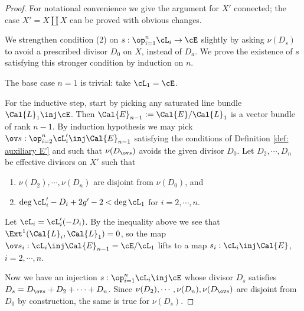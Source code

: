 \begin{proof} For notational convenience we give the argument for $X'$ connected; the case $X'=X\coprod X$ can be proved with obvious changes.

We strengthen condition (2) on $s:\op_{i=1}^{n}\cL_{i}\to \cE$ slightly by asking $\nu(D_{s})$ to avoid a prescribed divisor $D_{0}$ on $X$, instead of $D_{a}$.  We prove the existence of $s$ satisfying this stronger condition by induction on $n$.

The base case $n=1$ is trivial: take $\cL_{1}=\cE$. %

For the inductive step, start by picking any saturated line bundle $\Cal{L}_{1}\inj \cE$. %
Then $\Cal{E}_{n-1} := \Cal{E}/\Cal{L}_{1}$ is a vector bundle of rank $n-1$. By induction hypothesis  we may pick $\ov s: \op_{i=2}^{n}\cL'_{i} \inj \Cal{E}_{n-1}$ satisfying the conditions of Definition \ref{def: auxiliary E'} and such that $\nu(D_{\ov s})$ avoids the given divisor $D_{0}$. Let $D_{2},\cdots, D_{n}$ be effective divisors on $X'$ such that
\begin{enumerate}
\item $\nu(D_{2}),\cdots, \nu(D_{n})$ are disjoint from $\nu(D_{0})$, and
\item $\deg \cL'_{i}-D_{i}+2g'-2<  \deg \cL_{1}$ for $i=2,\cdots, n$.
\end{enumerate}
Let $\cL_{i}=\cL'_{i}(-D_{i})$. By the inequality above we see that $\Ext^1(\Cal{L}_i, \Cal{L}_1) = 0$, so the map $\ov s_{i}: \cL_{i} \inj \Cal{E}_{n-1}=\cE/\cL_1$ lifts to a map $s_{i}: \cL_{i} \inj \Cal{E}$, $i=2,\cdots, n$.

Now we have an injection $s: \op_{i=1}^{n}\cL_{i}\inj \cE$ whose divisor $D_{s}$ satisfies $D_{s}=D_{\ov s}+D_{2}+\cdots+D_{n}$. Since $\nu(D_{2}),\cdots, \nu(D_{n}), \nu(D_{\ov s})$ are disjoint from $D_{0}$ by construction, the same is true for $\nu(D_{s})$.
\end{proof}


